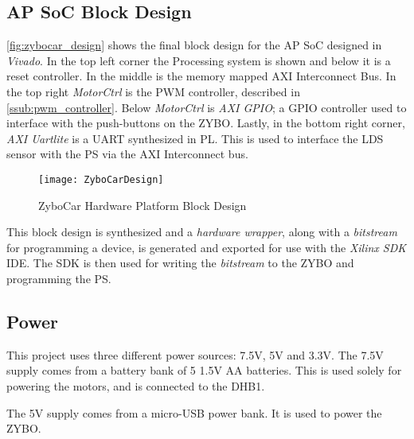 \documentclass[Main]{subfiles}
\begin{document}
			\newpage
			

		

	\subsection{AP SoC Block Design} %
	\label{sub:ap_soc_block_design}

		\autoref{fig:zybocar_design} shows the final block design for the AP SoC designed in \emph{Vivado}.
		In the top left corner the Processing system is shown and below it is a reset controller. 
		In the middle is the memory mapped AXI Interconnect Bus.
		In the top right \emph{MotorCtrl} is the PWM controller, described in \autoref{ssub:pwm_controller}.
		Below \emph{MotorCtrl} is \emph{AXI GPIO}; a GPIO controller used to interface with the push-buttons on the ZYBO.
		Lastly, in the bottom right corner, \emph{AXI Uartlite} is a UART synthesized in PL.
		This is used to interface the LDS sensor with the PS via the AXI Interconnect bus.

		\begin{figure}[H]
			\centering
			\texttt{[image: ZyboCarDesign]}
			\caption{ZyboCar Hardware Platform Block Design}
			\label{fig:zybocar_design}
		\end{figure}

		This block design is synthesized and a \emph{hardware wrapper}, along with a \emph{bitstream} for programming a device, is generated and exported for use with the \emph{Xilinx SDK} IDE.
		The SDK is then used for writing the \emph{bitstream} to the ZYBO and programming the PS. 


	\subsection{Power} %
	\label{sub:power}

		This project uses three different power sources: 7.5V, 5V and 3.3V.
		The 7.5V supply comes from a battery bank of 5 1.5V AA batteries.
		This is used solely for powering the motors, and is connected to the DHB1.

		The 5V supply comes from a micro-USB power bank. 
		It is used to power the ZYBO.
\end{document}
